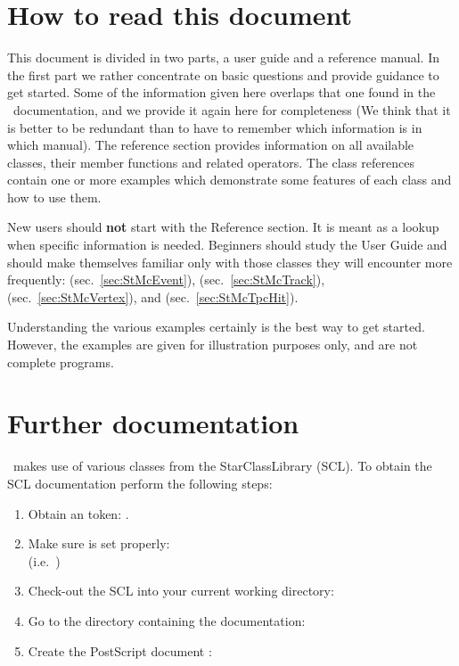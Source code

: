 \clearpage


\section{How to read this document}

This document is divided in two parts, a user guide and a
reference manual. In the first part we rather concentrate on basic
questions and provide guidance to get started.  Some of the information
given here overlaps that one found in the \StEvent\ documentation,
and we provide it again here for completeness (We think that it is better
to be redundant than to have to remember which information is in which
manual).  The reference section
provides information on all available classes, their member functions
and related operators. The class references contain one or more
examples which demonstrate some features of each class and how to use
them.

New users should \textbf{not} start with the Reference section. It is
meant as a lookup when specific information is needed. Beginners
should study the User Guide and should make themselves familiar only
with those classes they will encounter more frequently:
  (sec.~\ref{sec:StMcEvent}),
  (sec.~\ref{sec:StMcTrack}),
 (sec.~\ref{sec:StMcVertex}),
and  (sec.~\ref{sec:StMcTpcHit}).



Understanding the various
examples certainly is the best way to get started. However, the examples
are given for illustration purposes only, and are not complete programs.


\section{Further documentation}
\label{sec:furtherdoc}

\StMcEvent\ makes use of various classes from the StarClassLibrary (SCL).
To obtain the SCL documentation perform the following steps:
\begin{enumerate}
  \item Obtain an  token: .
  \item Make sure  is set properly: \\ %
	(i.e.~)
  \item Check-out the SCL into your current working directory:\\
  \item Go to the directory containing the documentation:\\
  \item Create the PostScript document :\\
\end{enumerate}
 

